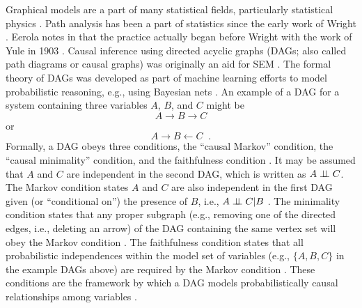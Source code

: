 Graphical models are a part of many statistical fields, particularly statistical physics \cite{Lauritzen1996}.  Path analysis has been a part of statistics since the early work of Wright \cite{Wright1934}.  Eerola notes in \cite{Eerola2012} that the practice actually began before Wright with the work of Yule in 1903 \cite{Yule1903}.  Causal inference using directed acyclic graphs (DAGs; also called path diagrams or causal graphs) was originally an aid for SEM \cite{Greenland2002}.  The formal theory of DAGs was developed as part of machine learning efforts to model probabilistic reasoning, e.g., using Bayesian nets \cite{Spirtes2000}.  An example of a DAG for a system containing three variables $A$, $B$, and $C$ might be
\begin{equation}
A \rightarrow B \rightarrow C
\end{equation}
or
\begin{equation}
A \rightarrow B \leftarrow C\;\;.
\end{equation}
Formally, a DAG obeys three conditions, the ``causal Markov'' condition, the ``causal minimality'' condition, and the faithfulness condition \cite{Spirtes2000,Pearl2000}.  It may be assumed that $A$ and $C$ are independent in the second DAG, which is written as $A\perp\!\!\!\perp C$.  The Markov condition states $A$ and $C$ are also independent in the first DAG given (or ``conditional on'') the presence of $B$, i.e., $A\perp\!\!\!\perp C|B$ \cite{Spirtes2000}.  The minimality condition states that any proper subgraph (e.g., removing one of the directed edges, i.e., deleting an arrow) of the DAG containing the same vertex set will obey the Markov condition \cite{Spirtes2000,Hitchcock2012}.  The faithfulness condition states that all probabilistic independences within the model set of variables (e.g., $\{A,B,C\}$ in the example DAGs above) are required by the Markov condition \cite{Spirtes2000,Pearl2000,Hitchcock2012}.  These conditions are the framework by which a DAG models probabilistically causal relationships among variables \cite{Pearl2000}.  

